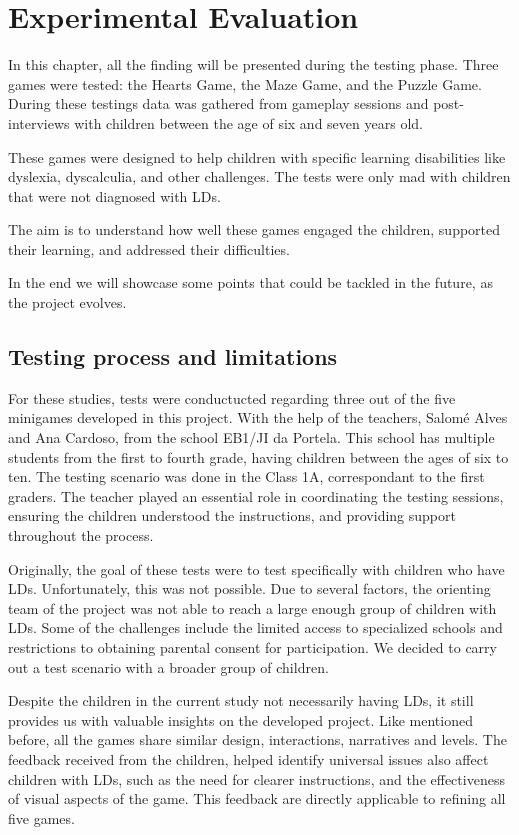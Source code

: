 \chapter{Experimental Evaluation}
\label{cha:results}

In this chapter, all the finding will be presented during the testing phase. Three games were tested: the Hearts Game, the Maze Game, and the Puzzle Game. During these testings data was gathered from gameplay sessions and post-interviews with children between the age of six and seven years old.

These games were designed to help children with specific learning disabilities like dyslexia, dyscalculia, and other challenges. The tests were only mad with children that were not diagnosed with LDs.

The aim is to understand how well these games engaged the children, supported their learning, and addressed their difficulties.

In the end we will showcase some points that could be tackled in the future, as the project evolves.

\newpage

\section{Testing process and limitations}

For these studies, tests were conductucted regarding three out of the five minigames developed in this project.
With the help of the teachers, Salomé Alves and Ana Cardoso, from the school EB1/JI da Portela. This school has multiple students from the first to fourth grade, having children between the ages of six to ten.
The testing scenario was done in the Class 1A, correspondant to the first graders.
The teacher played an essential role in coordinating the testing sessions, ensuring the children understood the instructions, and providing support throughout the process.

Originally, the goal of these tests were to test specifically with children who have LDs. Unfortunately, this was not possible. Due to several factors, the orienting team of the project was not able to reach a large enough group of children with LDs. Some of the challenges include the limited access to specialized schools and restrictions to obtaining parental consent for participation. We decided to carry out a test scenario with a broader group of children.

Despite the children in the current study not necessarily having LDs, it still provides us with valuable insights on the developed project. Like mentioned before, all the games share similar design, interactions, narratives and levels. The feedback received from the children, helped identify universal issues also affect children with LDs, such as the need for clearer instructions, and the effectiveness of visual aspects of the game. This feedback are directly applicable to refining all five games.

